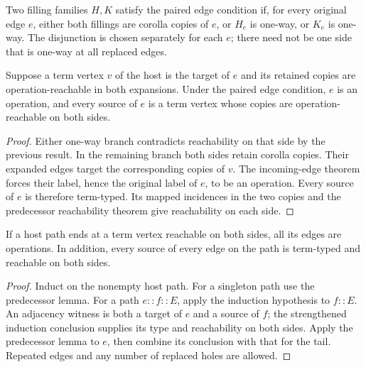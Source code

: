 \begin{definition}\label{term:paired-output-closure}
Two filling families $H,K$ satisfy the paired edge condition if, for every
original edge $e$, either both fillings are corolla copies of $e$, or $H_e$
is one-way, or $K_e$ is one-way. The disjunction is chosen separately for
each $e$; there need not be one side that is one-way at all replaced edges.
\end{definition}

\begin{lemma}
Suppose a term vertex $v$ of the host is the target of $e$ and its retained
copies are operation-reachable in both expansions. Under the paired edge
condition, $e$ is an operation, and every source of $e$ is a term vertex
whose copies are operation-reachable on both sides.
\end{lemma}
\begin{proof}
Either one-way branch contradicts reachability on that side by the previous
result. In the remaining branch both sides retain corolla copies. Their
expanded edges target the corresponding copies of $v$. The incoming-edge
theorem forces their label, hence the original label of $e$, to be an
operation. Every source of $e$ is therefore term-typed. Its mapped incidences
in the two copies and the predecessor reachability theorem give reachability
on each side.
\end{proof}

\begin{theorem}
If a host path ends at a term vertex reachable on both sides, all its edges
are operations. In addition, every source of every edge on the path is
term-typed and reachable on both sides.
\end{theorem}
\begin{proof}
Induct on the nonempty host path. For a singleton path use the predecessor
lemma. For a path $e::f::E$, apply the induction hypothesis to $f::E$. An
adjacency witness is both a target of $e$ and a source of $f$; the strengthened
induction conclusion supplies its type and reachability on both sides.
Apply the predecessor lemma to $e$, then combine its conclusion with that
for the tail. Repeated edges and any number of replaced holes are allowed.
\end{proof}

